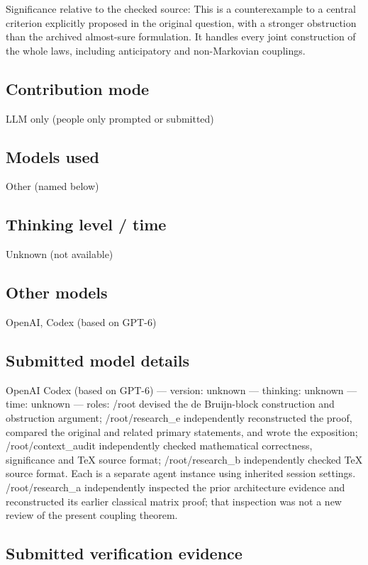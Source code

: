 \documentclass[11pt]{article}
\begin{document}
Significance relative to the checked source: This is a counterexample to a central criterion explicitly proposed in the original question, with a stronger obstruction than the archived almost-sure formulation. It handles every joint construction of the whole laws, including anticipatory and non-Markovian couplings.

\subsection{Contribution mode}

LLM only (people only prompted or submitted)

\subsection{Models used}

Other (named below)

\subsection{Thinking level / time}

Unknown (not available)

\subsection{Other models}

OpenAI, Codex (based on GPT-6)

\subsection{Submitted model details}

OpenAI Codex (based on GPT-6)  —  version: unknown  —  thinking: unknown  —  time: unknown  —  roles: /root devised the de Bruijn-block construction and obstruction argument; /root/research\_e independently reconstructed the proof, compared the original and related primary statements, and wrote the exposition; /root/context\_audit independently checked mathematical correctness, significance and TeX source format; /root/research\_b independently checked TeX source format. Each is a separate agent instance using inherited session settings. /root/research\_a independently inspected the prior architecture evidence and reconstructed its earlier classical matrix proof; that inspection was not a new review of the present coupling theorem.

\subsection{Submitted verification evidence}
\end{document}
